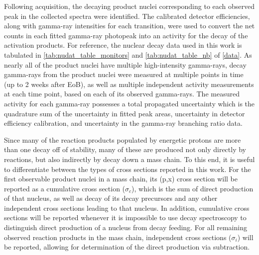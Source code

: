 \documentclass[%
 reprint,
superscriptaddress,
onecolumn,
linenumbers,
notitlepage,
 amsmath,amssymb,
 aps,
prc,
]{revtex4-1}
\begin{document}
Following  acquisition, the decaying product nuclei corresponding to each observed peak in the collected spectra were identified.
The calibrated detector efficiencies, along with gamma-ray intensities for each transition, were used to convert the net  counts in each fitted gamma-ray photopeak into an activity for the decay of the activation products.  
For reference, the nuclear decay data used in this work is tabulated in \autoref{tab:nudat_table_monitors} and \autoref{tab:nudat_table_nb} of \ref{data}.
As nearly all of the product nuclei have multiple high-intensity gamma-rays, decay gamma-rays from the product nuclei were measured at multiple points in time (up to 2 weeks after EoB), as well as multiple independent activity measurements at each time point, based on each of its observed gamma-rays.
The measured activity for each gamma-ray possesses a total propagated uncertainty which is the quadrature sum of the uncertainty in  fitted peak areas, uncertainty in detector efficiency calibration, and uncertainty in the gamma-ray branching ratio data.






Since many of the reaction products populated by energetic protons are more than one decay off of stability, many of these are produced not only  directly by reactions, but also indirectly by decay down a mass chain.
To this end, it is useful to differentiate between the types of cross sections reported in this work. 
For the first observable product nuclei in a mass chain, its (p,x) cross section will be reported as a cumulative cross section ($\sigma_c$), which is the sum of direct production of that nucleus, as well as decay of its decay precursors and any other independent cross sections leading to that nucleus. 
In addition, cumulative cross sections will be reported whenever it is impossible to use decay spectroscopy to distinguish direct production of a nucleus from decay feeding.
For all remaining observed reaction products in the mass chain, independent cross sections ($\sigma_i$) will be reported, allowing for determination of the direct production via subtraction.  
\end{document}
